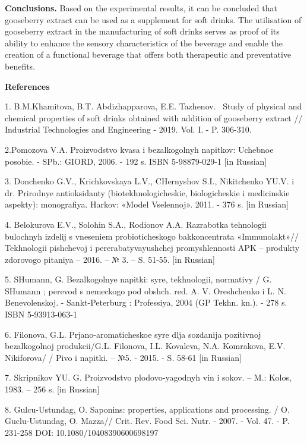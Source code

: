 {\bfseries Conclusions.} Based on the experimental results, it can be
concluded that gooseberry extract can be used as a supplement for soft
drinks. The utilisation of gooseberry extract in the manufacturing of
soft drinks serves as proof of its ability to enhance the sensory
characteristics of the beverage and enable the creation of a functional
beverage that offers both therapeutic and preventative benefits.

{\bfseries References}

1. B.M.Khamitova, B.T. Abdizhapparova, E.E. Tazhenov.~ Study of physical
and chemical properties of soft drinks obtained with addition of
gooseberry extract // Industrial Technologies and Engineering - 2019.
Vol. I. - P. 306-310.

2.Pomozova V.A. Proizvodstvo kvasa i bezalkogol\textquotesingle nyh
napitkov: Uchebnoe posobie. - SPb.: GIORD, 2006. - 192 s. ISBN
5-98879-029-1 {[}in Russian{]}

3. Donchenko G.V., Krichkovskaya L.V., CHernyshov S.I., Nikitchenko
YU.V. i dr. Prirodnye antioksidanty (biotekhnologicheskie,
biologicheskie i medicinskie aspekty): monografiya.
Har\textquotesingle kov: «Model\textquotesingle{} Vselennoj». 2011. -
376 s. {[}in Russian{]}

4. Belokurova E.V., Solohin S.A., Rodionov A.A. Razrabotka tehnologii
bulochnyh izdelij s vneseniem probioticheskogo bakkoncentrata
«Immunolakt»// Tekhnologii pishchevoj i pererabatyvayushchej
promyshlennosti APK -- produkty zdorovogo pitaniya -- 2016. -- № 3. --
S. 51-55. {[}in Russian{]}

5. SHumann, G. Bezalkogol\textquotesingle nye napitki:
syr\textquotesingle e, tekhnologii, normativy / G. SHumann ; perevod s
nemeckogo pod obshch. red. A. V. Oreshchenko i L. N. Benevolenskoj. -
Sankt-Peterburg : Professiya, 2004 (GP Tekhn. kn.). - 278 s. ISBN
5-93913-063-1

6. Filonova, G.L. Prjano-aromaticheskoe
syr\textquotesingle\textquotesingle e dlja sozdanija pozitivnoj
bezalkogol\textquotesingle\textquotesingle noj produkcii/G.L. Filonova,
I.L. Kovaleva, N.A. Komrakova, E.V. Nikiforova/ / Pivo i napitki. -- №5.
- 2015. - S. 58-61 {[}in Russian{]}

7. Skripnikov YU. G. Proizvodstvo plodovo-yagodnyh vin i sokov. -- M.:
Kolos, 1983. -- 256 s. {[}in Russian{]}

8. Gulcu-Ustundag, O. Saponins: properties, applications and processing.
/ O. Guclu-Ustundag, O. Mazza// Crit. Rev. Food Sci. Nutr. - 2007. -
Vol. 47. - P. 231-258 DOI: 10.1080/10408390600698197


